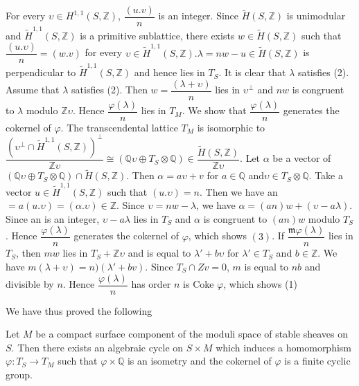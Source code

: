 \begin{Proof}
For every $\upsilon \in H^{1,1}(S,\mathbb{Z})$, $\dfrac{(u.v)}{n}$ is
an integer. Since $\widetilde{H}(S,\mathbb{Z})$ is unimodular and
$\widetilde{H}^{1,1}(S,\mathbb{Z})$ is a primitive sublattice, there
exists $w\in \widetilde{H}(S,\mathbb{Z})$ such that
$\dfrac{(u.\upsilon)}{n}=(w.v)$ for every
$\upsilon \in \widetilde{H}^{1,1}(S,\mathbb{Z}).\lambda=nw-u\in \widetilde{H}(S,\mathbb{Z})$
is perpendicular to $\widetilde{H}^{1,1}(S,\mathbb{Z})$ and hence lies
in $T_S$. It is clear that $\lambda$ satisfies (2). Assume that
$\lambda$ satisfies (2). Then $w=\dfrac{(\lambda+\upsilon)}{n}$ lies
in $\upsilon^{\perp}$ and $nw$ is congruent to $\lambda$ modulo
$\mathbb{Z}\upsilon$. Hence $\dfrac{\varphi(\lambda)}{n}$ lies in
$T_M$. We show that $\dfrac{\varphi(\lambda)}{n}$ generates the
cokernel  of $\varphi$. The transcendental lattice $T_M$ is isomorphic
to
$\dfrac{\left(\upsilon^{\perp}\cap \widetilde{H}^{1,1}(S,\mathbb{Z})\right)^{\perp}}{\mathbb{Z}\upsilon}\cong
(\mathbb{Q}\upsilon \oplus
T_S\otimes \mathbb{Q})\in \dfrac{\widetilde{H}(S,\mathbb{Z})}{\mathbb{Z}\upsilon}$. Let
$\alpha$ be a vector of $(\mathbb{Q} \upsilon \oplus
T_S\otimes \mathbb{Q})\cap \widetilde{H}(S,\mathbb{Z})$. Then
$\alpha=a\upsilon +v$ for $a\in \mathbb{Q}$ and\pageoriginale $\upsilon \in
T_S\otimes \mathbb{Q}$. Take a vector
$u\in\widetilde{H}^{1,1}(S,\mathbb{Z})$ such that
$(u.\upsilon)=n$. Then we have an
$=a(u.\upsilon)=(\alpha.\upsilon)\in \mathbb{Z}$. Since
$\upsilon=nw-\lambda$, we have
$\alpha=(an)w+(\upsilon-a\lambda)$. Since an is an integer,
$\upsilon-a\lambda$ lies in $T_S$ and $\alpha$ is congruent to $(an)w$
modulo $T_S$. Hence $\dfrac{\varphi(\lambda)}{n}$ generates the
cokernel of $\varphi$, which shows $(3)$. If
$\dfrac{\mathfrak{m}\varphi(\lambda)}{n}$ lies in $T_S$, then $mw$
lies in $T_S+\mathbb{Z}\upsilon$ and is equal to $\lambda'+b\upsilon$
for $\lambda'\in T_S$ and $b\in \mathbb{Z}$. We have
$m(\lambda+\upsilon)=n)(\lambda'+b v)$. Since $T_S\cap Zv=0 $, $m$ is
equal to $nb$ and divisible by $n$. Hence
$\dfrac{\varphi(\lambda)}{n}$ has order $n$ is Coke $\varphi$, which
shows (1)
\enprf
\end{Proof}

We have thus proved the following 

\begin{cor}\label{cor6.5}
Let $M$ be a compact surface component  of the moduli space of stable
sheaves on $S$. Then there exists an algebraic cycle on $S\times M$
which induces a homomorphism $\varphi: T_S\to T_M$ such that
$\varphi\times \mathbb{Q}$ is an isometry and the cokernel of
$\varphi$ is a finite cyclic group. 
\end{cor}

